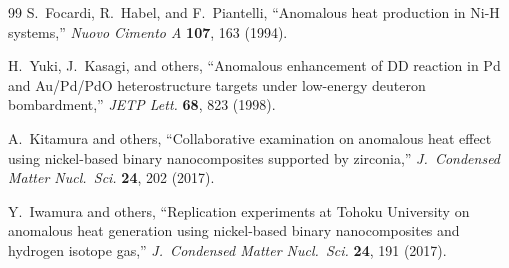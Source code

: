 \documentclass[a4paper]{article}
\begin{document}
\begin{thebibliography}{99}
S.~Focardi, R.~Habel, and F.~Piantelli,
``Anomalous heat production in Ni-H systems,''
\textit{Nuovo Cimento A} \textbf{107}, 163 (1994).

H.~Yuki, J.~Kasagi, and others,
``Anomalous enhancement of DD reaction in Pd and Au/Pd/PdO heterostructure targets under low-energy deuteron bombardment,''
\textit{JETP Lett.} \textbf{68}, 823 (1998).

A.~Kitamura and others,
``Collaborative examination on anomalous heat effect using nickel-based binary nanocomposites supported by zirconia,''
\textit{J.~Condensed Matter Nucl.~Sci.} \textbf{24}, 202 (2017).

Y.~Iwamura and others,
``Replication experiments at Tohoku University on anomalous heat generation using nickel-based binary nanocomposites and hydrogen isotope gas,''
\textit{J.~Condensed Matter Nucl.~Sci.} \textbf{24}, 191 (2017).

\end{thebibliography}
\end{document}
